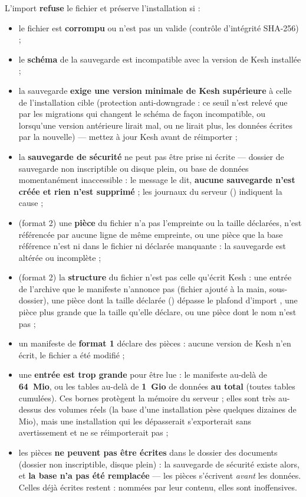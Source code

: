 \documentclass[a4paper,11pt,oneside]{article}
\begin{document}
L'import \textbf{refuse} le fichier et préserve l'installation si :
\begin{itemize}
    \item le fichier est \textbf{corrompu} ou n'est pas un  valide (contrôle d'intégrité SHA-256) ;
    \item le \textbf{schéma} de la sauvegarde est incompatible avec la version de Kesh installée ;
    \item la sauvegarde \textbf{exige une version minimale de Kesh supérieure} à celle de l'installation cible (protection anti-downgrade : ce seuil n'est relevé que par les migrations qui changent le schéma de façon incompatible, ou lorsqu'une version antérieure lirait mal, ou ne lirait plus, les données écrites par la nouvelle) — mettez à jour Kesh avant de réimporter ;
    \item la \textbf{sauvegarde de sécurité} ne peut pas être prise ni écrite --- dossier de sauvegarde non inscriptible ou disque plein, ou base de données momentanément inaccessible : le message le dit, \textbf{aucune sauvegarde n'est créée et rien n'est supprimé} ; les journaux du serveur () indiquent la cause ;
    \item (format 2) une \textbf{pièce} du fichier n'a pas l'empreinte ou la taille déclarées, n'est référencée par aucune ligne de même empreinte, ou une pièce que la base référence n'est ni dans le fichier ni déclarée manquante : la sauvegarde est altérée ou incomplète ;
    \item (format 2) la \textbf{structure} du fichier n'est pas celle qu'écrit Kesh : une entrée de l'archive que le manifeste n'annonce pas (fichier ajouté à la main, sous-dossier), une pièce dont la taille déclarée () dépasse le plafond d'import , une pièce plus grande que la taille qu'elle déclare, ou une pièce dont le nom n'est pas  ;
    \item un manifeste de \textbf{format 1} déclare des pièces : aucune version de Kesh n'en écrit, le fichier a été modifié ;
    \item une \textbf{entrée est trop grande} pour être lue : le manifeste au-delà de \textbf{64~Mio}, ou les tables au-delà de \textbf{1~Gio} de données \textbf{au total} (toutes tables cumulées). Ces bornes protègent la mémoire du serveur ; elles sont très au-dessus des volumes réels (la base d'une installation pèse quelques dizaines de Mio), mais une installation qui les dépasserait s'exporterait sans avertissement et ne se réimporterait pas ;
    \item les pièces \textbf{ne peuvent pas être écrites} dans le dossier des documents (dossier non inscriptible, disque plein) : la sauvegarde de sécurité existe alors, et \textbf{la base n'a pas été remplacée} --- les pièces s'écrivent \emph{avant} les données. Celles déjà écrites restent : nommées par leur contenu, elles sont inoffensives.
\end{itemize}
\end{document}
